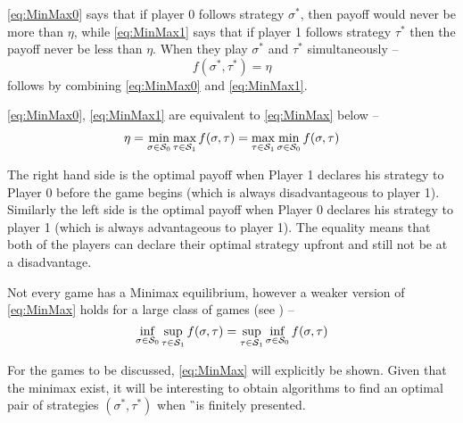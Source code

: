 \eqref{eq:MinMax0} says that if player 0 follows strategy $\sigma^*$, then payoff would never be more than $\eta$, while \eqref{eq:MinMax1} says that if player 1 follows strategy $\tau^*$ then the payoff never be less than $\eta$. When they play $\sigma^*$ and $\tau^*$ simultaneously -- 
\[
    f(\sigma^*,\tau^*) = \eta
\]
follows by combining \eqref{eq:MinMax0} and \eqref{eq:MinMax1}.

\eqref{eq:MinMax0}, \eqref{eq:MinMax1} are equivalent to \eqref{eq:MinMax} below --
\begin{align}
    \eta = \min_{\sigma \in \mathcal{S}_0} \max_{\tau \in \mathcal{S}_1} f(\sigma, \tau) = \max_{\tau \in \mathcal{S}_1} \min_{\sigma \in \mathcal{S}_0 } f(\sigma,\tau) \label{eq:MinMax}
\end{align}

The right hand side is the optimal payoff when Player 1 declares his strategy to Player 0 before the game begins (which is always disadvantageous to player 1). Similarly the left side is the optimal payoff when Player 0 declares his strategy to player 1 (which is always advantageous to player 1). The equality means that both of the players can declare their optimal strategy upfront and still not be at a disadvantage.

Not every game has a Minimax equilibrium, however a weaker version of \eqref{eq:MinMax} holds for a large class of games (see \cite{roux_equilibria}) --
\[
    \inf_{\sigma \in \mathcal{S}_0} \sup_{\tau \in \mathcal{S}_1} f(\sigma, \tau) = \sup_{\tau \in \mathcal{S}_1} \inf_{\sigma \in \mathcal{S}_0 } f(\sigma,\tau)
\]

For the games to be discussed, \eqref{eq:MinMax} will explicitly be shown. Given that the minimax exist, it will be interesting to obtain algorithms to find an optimal pair of strategies $(\sigma^*,\tau^*)$ when \G\ is finitely presented.

